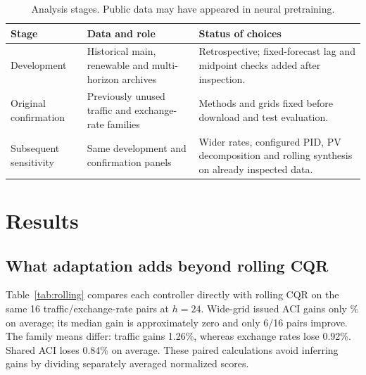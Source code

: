 \documentclass[preprint,11pt]{elsarticle}
\newcommand{\IS}{\operatorname{IS}}
\begin{document}
\begin{table}[!htbp]\centering\small
\caption{Analysis stages. Public data may have appeared in neural pretraining.}
\label{tab:phases}
\begin{tabular}{p{}p{}p{}}\toprule
Stage & Data and role & Status of choices \\\midrule
Development & Historical main, renewable and multi-horizon archives & Retrospective;
fixed-forecast lag and midpoint checks added after inspection. \\
Original confirmation & Previously unused traffic and exchange-rate families &
Methods and grids fixed before download and test evaluation. \\
Subsequent sensitivity & Same development and confirmation panels & Wider rates,
configured PID, PV decomposition and rolling synthesis on already inspected data. \\\bottomrule
\end{tabular}\end{table}

\section{Results}
\subsection{What adaptation adds beyond rolling CQR}\label{sec:rolling}
Table~\ref{tab:rolling} compares each controller directly with rolling CQR on the
same 16 traffic/exchange-rate pairs at $h=24$. Wide-grid issued ACI gains only
\IssuedRollingGain\% on average; its median gain is approximately zero and only
6/16 pairs improve. The family means differ: traffic gains 1.26\%, whereas exchange
rates lose 0.92\%. Shared ACI loses 0.84\% on average. These paired calculations
avoid inferring gains by dividing separately averaged normalized scores.

\begin{table}[!htbp]\centering\scriptsize
\caption{Direct comparisons with rolling CQR at $h=24$, traffic/exchange rates.
Gain is the mean of $100(1-\IS_A/\IS_{\rm rolling})$ within each matched pair; positive
is better. Coverage is percent; Local is absolute 150-origin coverage error in
percentage points. Deltas subtract rolling values. ACI uses the wide grid.
Wins are descriptive signs, not independent significant replications.}
\label{tab:rolling}
\end{table}
\end{document}
